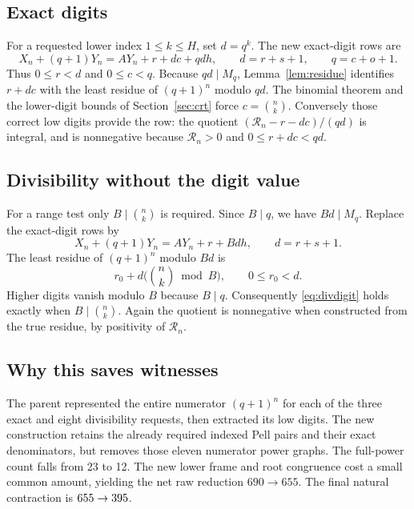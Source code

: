\documentclass[10pt,letterpaper]{article}
\theoremstyle{remark}\newtheorem{remark}[theorem]{Remark}
\begin{document}
\subsection{Exact digits}

For a requested lower index $1\le k\le H$, set $d=q^k$.
The new exact-digit rows are
\begin{equation}\label{eq:digit}
 X_n+(q+1)Y_n=AY_n+r+dc+qd h,\qquad
 d=r+s+1,\qquad q=c+o+1.
\end{equation}
Thus $0\le r<d$ and $0\le c<q$. Because $qd\mid M_q$,
Lemma~\ref{lem:residue} identifies $r+dc$ with the least residue of
$(q+1)^n$ modulo $qd$. The binomial theorem and the lower-digit bounds
of Section~\ref{sec:crt} force $c=\binom nk$.
Conversely those correct low digits provide the row: the quotient
$(\mathcal R_n-r-dc)/(qd)$ is integral, and is nonnegative because
$\mathcal R_n>0$ and $0\le r+dc<qd$.

\subsection{Divisibility without the digit value}

For a range test only $B\mid\binom nk$ is required. Since $B\mid q$,
we have $Bd\mid M_q$. Replace the exact-digit rows by
\begin{equation}\label{eq:divdigit}
 X_n+(q+1)Y_n=AY_n+r+Bd h,\qquad d=r+s+1.
\end{equation}
The least residue of $(q+1)^n$ modulo $Bd$ is
\[
 r_0+d\bigl(\binom nk\bmod B\bigr),\qquad 0\le r_0<d.
\]
Higher digits vanish modulo $B$ because $B\mid q$. Consequently
\eqref{eq:divdigit} holds exactly when $B\mid\binom nk$.
Again the quotient is nonnegative when constructed from the true
residue, by positivity of $\mathcal R_n$.

\subsection{Why this saves witnesses}

The parent represented the entire numerator $(q+1)^n$ for each of the
three exact and eight divisibility requests, then extracted its low
digits. The new construction retains the already required indexed Pell
pairs and their exact denominators, but removes those eleven numerator
power graphs. The full-power count falls from 23 to 12. The new lower
frame and root congruence cost a small common amount, yielding the net
raw reduction $690\to655$. The final natural contraction is
$655\to395$.
\end{document}
